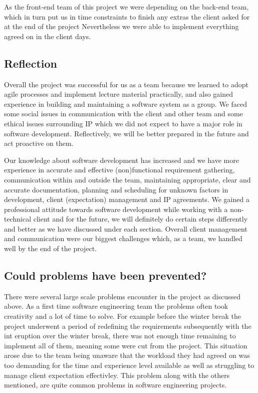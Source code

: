 \documentclass{l3proj}
\begin{document}
As the front-end team of this project we were depending on the back-end team, which in turn put us in time constraints to finish any extras the client asked for at the end of the project Nevertheless we were able to implement everything agreed on in the client days. 

\subsection{Reflection }
Overall the project was successful for us as a team because we learned to adopt agile processes and implement lecture material practically, and also gained experience in building and maintaining a software system as a group. 
We faced some social issues in communication with the client and other team and some ethical issues surrounding IP which we did not expect to have a major role in software development. 
Reflectively, we will be better prepared in the future and act proactive on them. 

Our knowledge about software development has increased and we have more experience in accurate and effective (non)functional requirement gathering, communication within and outside the team, maintaining appropriate, clear and accurate documentation, planning and scheduling for unknown factors in development, client (expectation) management and IP agreements.
We gained a professional attitude towards software development while working with a non-technical client and for the future, we will definitely do certain steps differently and better as we have discussed under each section. Overall client management and communication were our biggest challenges which, as a team, we handled well by the end of the project.  

\subsection{Could problems have been prevented?}
There were several large scale problems encounter in the project as discussed above. As a first time software engineering team the problems often took creativity and a lot of time to solve. For example before the winter break the project underwent a period of redefining the requirements subsequently with the int eruption over the winter break, there was not enough time remaining to implement all of them, meaning some were cut from the project. This situation arose due to the team being unaware that the workload they had agreed on was too demanding for the time and experience level available as well as struggling to manage client expectation effectivley. This problem along with the others mentioned, are quite common problems in software engineering projects.
\end{document}
